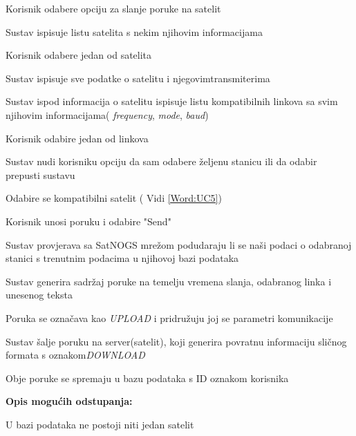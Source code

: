 \begin{packed_item}
\begin{packed_enum}
						\item Korisnik odabere opciju za slanje poruke na satelit
						\item Sustav ispisuje listu satelita s nekim njihovim informacijama
						\item Korisnik odabere jedan od satelita
						\item Sustav ispisuje sve podatke o satelitu i njegovim\newline transmiterima
						\item Sustav ispod informacija o satelitu ispisuje listu  kompatibilnih linkova sa svim njihovim informacijama( \textit{frequency}, \textit{mode}, \textit{baud})
						\item Korisnik odabire jedan od linkova
						\item Sustav nudi korisniku opciju da sam odabere željenu stanicu ili da \newline odabir prepusti sustavu
						\item Odabire se kompatibilni satelit ( Vidi \ref{Word:UC5})
						\item {} 
						\item Korisnik unosi poruku i odabire "Send"
						\item Sustav provjerava sa SatNOGS mrežom podudaraju li se naši podaci o \newline odabranoj stanici s trenutnim podacima u njihovoj bazi podataka
						\item Sustav generira sadržaj poruke na temelju vremena slanja, odabranog linka i unesenog teksta
						\item Poruka se označava kao \textit{UPLOAD} i pridružuju joj se parametri komunikacije
						\item Sustav šalje poruku na server(satelit), koji generira povratnu informaciju sličnog formata s oznakom\newline \textit{DOWNLOAD}
						\item Obje poruke se spremaju u bazu podataka s ID oznakom korisnika
						
						
					\end{packed_enum}
					
					\item  \textbf{Opis mogućih odstupanja: }
					
					\item[] \begin{packed_item}
						\item[1] U bazi podataka ne postoji niti jedan satelit
						\item[ ] \begin{packed_enum}
							

\end{packed_enum}
\end{packed_item}
\end{packed_item}
